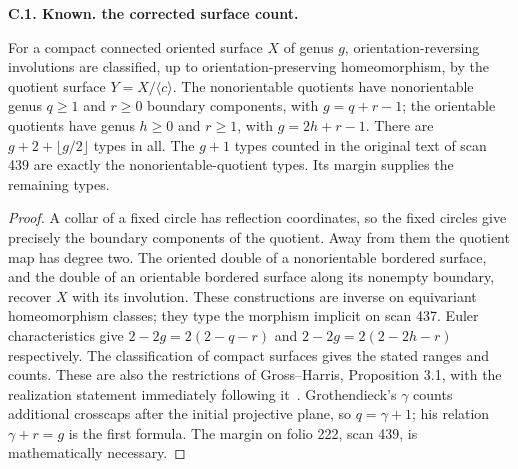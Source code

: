 \documentclass[11pt,oneside]{article}
\makeatletter
\newcounter{statementanchor}
\newenvironment{statement}[3]{%
 \refstepcounter{statementanchor}\def\@currentlabel{#1}%
 \par\addvspace{9pt}\noindent
 \textbf{#1. #2. #3.}\par\nobreak\noindent\ignorespaces
}{\par\addvspace{5pt}}
\makeatother
\begin{document}
\begin{statement}{C.1}{Known}{the corrected surface count}
\label{st:C.1}
\label{C-classification}
For a compact connected oriented surface $X$ of genus $g$,
orientation-reversing involutions are classified, up to
orientation-preserving homeomorphism, by the quotient
surface $Y=X/\langle c\rangle$. The nonorientable quotients
have nonorientable genus $q\geq1$ and $r\geq0$ boundary
components, with $g=q+r-1$; the orientable quotients have
genus $h\geq0$ and $r\geq1$, with $g=2h+r-1$.
There are $g+2+\lfloor g/2\rfloor$ types in all.
The $g+1$ types counted in the original text of scan 439
are exactly the nonorientable-quotient types.
Its margin supplies the remaining types.
\end{statement}
\begin{proof}
A collar of a fixed circle has reflection coordinates, so the
fixed circles give precisely the boundary components of the
quotient. Away from them the quotient map has degree two.
The oriented double of a nonorientable bordered surface,
and the double of an orientable bordered surface along its
nonempty boundary, recover $X$ with its involution.
These constructions are inverse on equivariant homeomorphism
classes; they type the morphism implicit on scan 437.
Euler characteristics give $2-2g=2(2-q-r)$ and
$2-2g=2(2-2h-r)$ respectively. The classification of compact
surfaces gives the stated ranges and counts.
These are also the restrictions of Gross--Harris,
Proposition 3.1, with the realization statement immediately
following it~\cite{GrossHarris1981}.
Grothendieck's $\gamma$ counts additional crosscaps after
the initial projective plane, so $q=\gamma+1$; his relation
$\gamma+r=g$ is the first formula. The margin on
folio 222, scan 439, is mathematically necessary.
\end{proof}
\end{document}
